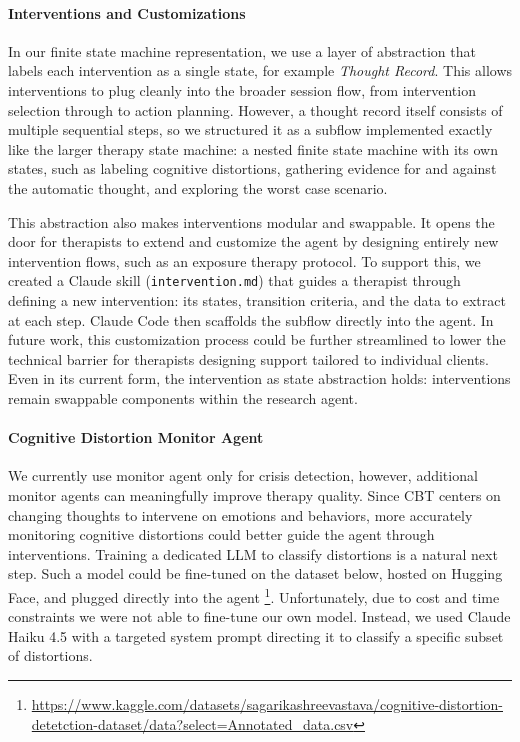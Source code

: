 \documentclass[twoside]{report}
\begin{document}
\paragraph{Interventions and Customizations}
In our finite state machine representation, we use a layer of abstraction that labels each intervention as a single state, for example \textit{Thought Record}. This allows interventions to plug cleanly into the broader session flow, from intervention selection through to action planning. However, a thought record itself consists of multiple sequential steps, so we structured it as a subflow implemented exactly like the larger therapy state machine: a nested finite state machine with its own states, such as labeling cognitive distortions, gathering evidence for and against the automatic thought, and exploring the worst case scenario.

This abstraction also makes interventions modular and swappable. It opens the door for therapists to extend and customize the agent by designing entirely new intervention flows, such as an exposure therapy protocol. To support this, we created a Claude skill (\texttt{intervention.md}) that guides a therapist through defining a new intervention: its states, transition criteria, and the data to extract at each step. Claude Code then scaffolds the subflow directly into the agent. In future work, this customization process could be further streamlined to lower the technical barrier for therapists designing support tailored to individual clients. Even in its current form, the intervention as state abstraction holds: interventions remain swappable components within the research agent.

\paragraph{Cognitive Distortion Monitor Agent}
We currently use monitor agent only for crisis detection, however, additional monitor agents can meaningfully improve therapy quality. Since CBT centers on changing thoughts to intervene on emotions and behaviors, more accurately monitoring cognitive distortions could better guide the agent through interventions. Training a dedicated LLM to classify distortions is a natural next step. Such a model could be fine-tuned on the dataset below, hosted on Hugging Face, and plugged directly into the agent \footnote{\url{https://www.kaggle.com/datasets/sagarikashreevastava/cognitive-distortion-detetction-dataset/data?select=Annotated_data.csv}}. Unfortunately, due to cost and time constraints we were not able to fine-tune our own model. Instead, we used Claude Haiku 4.5 with a targeted system prompt directing it to classify a specific subset of distortions.
\end{document}
